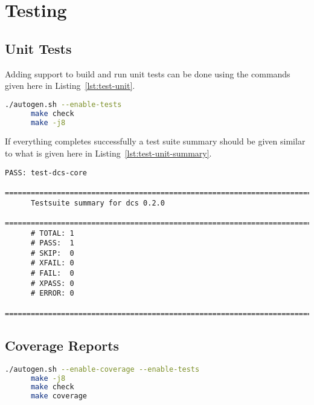\section{Testing}\label{sec:test}

  \subsection{Unit Tests}\label{sec:test-unit}

    Adding support to build and run unit tests can be done using the commands given here
    in Listing~\ref{lst:test-unit}.

    \begin{lstlisting}[language=bash,caption={Compiling and Running Unit Tests},label={lst:test-unit}]
      ./autogen.sh --enable-tests
      make check
      make -j8
    \end{lstlisting}

    If everything completes successfully a test suite summary should be given similar to
    what is given here in Listing~\ref{lst:test-unit-summary}.

    \begin{lstlisting}[caption={Test Suite Summary},label={lst:test-unit-summary}]
      PASS: test-dcs-core
      ============================================================================
      Testsuite summary for dcs 0.2.0
      ============================================================================
      # TOTAL: 1
      # PASS:  1
      # SKIP:  0
      # XFAIL: 0
      # FAIL:  0
      # XPASS: 0
      # ERROR: 0
      ============================================================================
    \end{lstlisting}

  \subsection{Coverage Reports}\label{sec:test-cov}

    \begin{lstlisting}[language=bash,caption={Generating Coverage Reports},label={lst:test-cov}]
      ./autogen.sh --enable-coverage --enable-tests
      make -j8
      make check
      make coverage
    \end{lstlisting}

